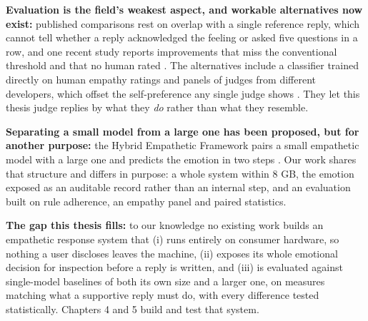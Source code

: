 \textbf{Evaluation is the field's weakest aspect, and workable alternatives now exist: }published comparisons rest on overlap with a single reference reply, which cannot tell whether a reply acknowledged the feeling or asked five questions in a row, and one recent study reports improvements that miss the conventional threshold and that no human rated \cite{rasool2025}. The alternatives include a classifier trained directly on human empathy ratings \cite{giorgi2024wassa,yang2024hyy33} and panels of judges from different developers, which offset the self-preference any single judge shows \cite{zheng2023judge,verga2024,panickssery2024}. They let this thesis judge replies by what they \textit{do} rather than what they resemble.

\textbf{Separating a small model from a large one has been proposed, but for another purpose: }the Hybrid Empathetic Framework pairs a small empathetic model with a large one and predicts the emotion in two steps \cite{yang2024hef}. Our work shares that structure and differs in purpose: a whole system within 8 GB, the emotion exposed as an auditable record rather than an internal step, and an evaluation built on rule adherence, an empathy panel and paired statistics.

\textbf{The gap this thesis fills:} to our knowledge no existing work builds an empathetic response system that (i) runs entirely on consumer hardware, so nothing a user discloses leaves the machine, (ii) exposes its whole emotional decision for inspection before a reply is written, and (iii) is evaluated against single-model baselines of both its own size and a larger one, on measures matching what a supportive reply must do, with every difference tested statistically. Chapters 4 and 5 build and test that system.
